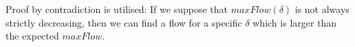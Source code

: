 \begin{proofsketch}
  Proof by contradiction is utilised: If we suppose that $maxFlow\left(\delta\right)$ is not always strictly decreasing, then
  we can find a flow for a specific $\delta$ which is larger than the expected $maxFlow$.
\end{proofsketch}
